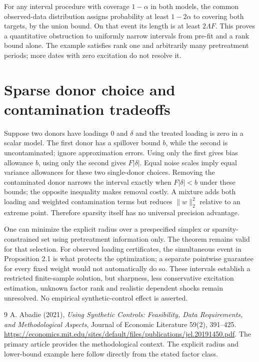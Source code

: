\documentclass[11pt,a4paper]{article}
\begin{document}
For any interval procedure with coverage $1-\alpha$ in both models, the common observed-data distribution assigns probability at least $1-2\alpha$ to covering both targets, by the union bound. On that event its length is at least $2\Lambda F$. This proves a quantitative obstruction to uniformly narrow intervals from pre-fit and a rank bound alone. The example satisfies rank one and arbitrarily many pretreatment periods; more dates with zero excitation do not resolve it.

\section{Sparse donor choice and contamination tradeoffs}
Suppose two donors have loadings $0$ and $\delta$ and the treated loading is zero in a scalar model. The first donor has a spillover bound $b$, while the second is uncontaminated; ignore approximation errors. Using only the first gives bias allowance $b$, using only the second gives $F|\delta|$. Equal noise scales imply equal variance allowances for these two single-donor choices. Removing the contaminated donor narrows the interval exactly when $F|\delta|<b$ under these bounds; the opposite inequality makes removal costly. A mixture adds both loading and weighted contamination terms but reduces $\|w\|_2^2$ relative to an extreme point. Therefore sparsity itself has no universal precision advantage.

One can minimize the explicit radius over a prespecified simplex or sparsity-constrained set using pretreatment information only. The theorem remains valid for that selection. For observed loading certificates, the simultaneous event in Proposition 2.1 is what protects the optimization; a separate pointwise guarantee for every fixed weight would not automatically do so. These intervals establish a restricted finite-sample solution, but sharpness, less conservative excitation estimation, unknown factor rank and realistic dependent shocks remain unresolved. No empirical synthetic-control effect is asserted.

\begin{thebibliography}{9}
 A. Abadie (2021), \emph{Using Synthetic Controls: Feasibility, Data Requirements, and Methodological Aspects}, Journal of Economic Literature 59(2), 391--425. \url{https://economics.mit.edu/sites/default/files/publications/jel.20191450.pdf}. The primary article provides the methodological context. The explicit radius and lower-bound example here follow directly from the stated factor class.
\end{thebibliography}
\end{document}
